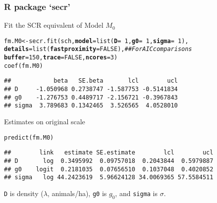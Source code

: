 \documentclass[color=usenames,dvipsnames]{beamer}\usepackage[]{graphicx}\usepackage[]{xcolor}
\makeatletter
\newcommand{\hlnum}[1]{\textcolor[rgb]{0.69,0.494,0}{#1}}%
\newcommand{\hlcom}[1]{\textcolor[rgb]{0.514,0.506,0.514}{\textit{#1}}}%
\newcommand{\hlopt}[1]{\textcolor[rgb]{0,0,0}{#1}}%
\newcommand{\hldef}[1]{\textcolor[rgb]{0,0,0}{#1}}%
\newcommand{\hlkwb}[1]{\textcolor[rgb]{0,0.341,0.682}{#1}}%
\newcommand{\hlkwc}[1]{\textcolor[rgb]{0,0,0}{\textbf{#1}}}%
\newcommand{\hlkwd}[1]{\textcolor[rgb]{0.004,0.004,0.506}{#1}}%
\newenvironment{kframe}{%
 \def\at@end@of@kframe{}%
 \ifinner\ifhmode%
  \def\at@end@of@kframe{\end{minipage}}%
  \begin{minipage}{\columnwidth}%
 \fi\fi%
 \def\FrameCommand##1{\hskip\@totalleftmargin \hskip-\fboxsep
 \colorbox{shadecolor}{##1}\hskip-\fboxsep
     \hskip-\linewidth \hskip-\@totalleftmargin \hskip\columnwidth}%
 \MakeFramed {\advance\hsize-\width
   \@totalleftmargin\z@ \linewidth\hsize
   \@setminipage}}%
 {\par\unskip\endMakeFramed%
 \at@end@of@kframe}
\newenvironment{knitrout}{}{} %
\newcommand{\inr}[1]{\colorbox{inlinecolor}{\texttt{#1}}}
\makeatother
\begin{document}
\begin{frame}[fragile]
  \frametitle{R package `secr'}
  Fit the SCR equivalent of Model $M_0$
\begin{knitrout}\scriptsize
{}\color{fgcolor}\begin{kframe}
\begin{alltt}
\hldef{fm.M0} \hlkwb{<-} \hlkwd{secr.fit}\hldef{(sch,} \hlkwc{model}\hldef{=}\hlkwd{list}\hldef{(}\hlkwc{D}\hldef{=}\hlopt{~}\hlnum{1}\hldef{,} \hlkwc{g0}\hldef{=}\hlopt{~}\hlnum{1}\hldef{,} \hlkwc{sigma}\hldef{=}\hlopt{~}\hlnum{1}\hldef{),}
    \hlkwc{details} \hldef{=} \hlkwd{list}\hldef{(}\hlkwc{fastproximity} \hldef{=} \hlnum{FALSE}\hldef{),} \hlcom{## For AIC comparisons}
    \hlkwc{buffer}\hldef{=}\hlnum{150}\hldef{,} \hlkwc{trace}\hldef{=}\hlnum{FALSE}\hldef{,} \hlkwc{ncores}\hldef{=}\hlnum{3}\hldef{)}
\hlkwd{coef}\hldef{(fm.M0)}
\end{alltt}
\begin{verbatim}
##            beta   SE.beta       lcl        ucl
## D     -1.050968 0.2738747 -1.587753 -0.5141834
## g0    -1.276753 0.4489717 -2.156721 -0.3967843
## sigma  3.789683 0.1342465  3.526565  4.0528010
\end{verbatim}
\end{kframe}
\end{knitrout}
\pause
\vfill
Estimates on original scale
\begin{knitrout}\scriptsize
{}\color{fgcolor}\begin{kframe}
\begin{alltt}
\hlkwd{predict}\hldef{(fm.M0)}
\end{alltt}
\begin{verbatim}
##        link   estimate SE.estimate        lcl        ucl
## D       log  0.3495992  0.09757018  0.2043844  0.5979887
## g0    logit  0.2181035  0.07656510  0.1037048  0.4020852
## sigma   log 44.2423619  5.96624128 34.0069365 57.5584511
\end{verbatim}
\end{kframe}
\end{knitrout}
\inr{D} is density ($\lambda$, animals/ha), \inr{g0} is $g_0$, and \inr{sigma} is 
$\sigma$.   
\end{frame}
\end{document}
